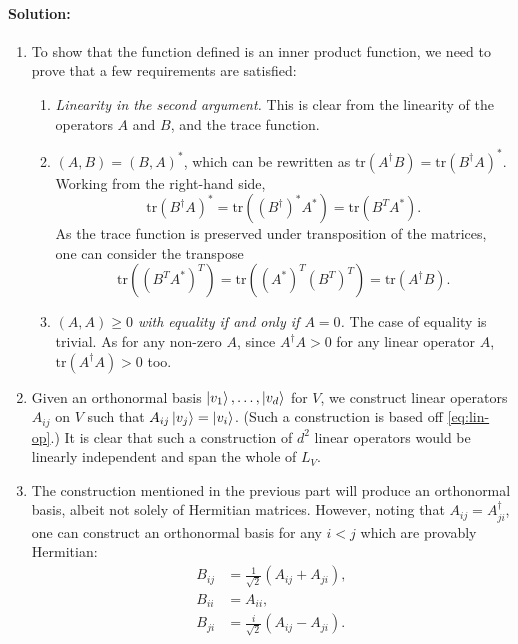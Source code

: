 \paragraph{Solution:} \begin{enumerate}
  \item To show that the function defined is an inner product function, we need
    to prove that a few requirements are satisfied: \begin{enumerate}
      \item \emph{Linearity in the second argument.} This is clear from the
        linearity of the operators $A$ and $B$, and the trace function.
      \item \emph{$(A, B) = (B, A)^*$}, which can be rewritten as $\mathrm{tr}
        (A^\dagger B) = \mathrm{tr}(B^\dagger A)^*$. Working from the
        right-hand side, \begin{equation*}
          \mathrm{tr}(B^\dagger A)^* = \mathrm{tr}((B^\dagger)^* A^*) =
            \mathrm{tr}(B^T A^*).
        \end{equation*}
        As the trace function is preserved under transposition of the matrices,
        one can consider the transpose \begin{equation*}
          \mathrm{tr}((B^T A^*)^T) = \mathrm{tr}((A^*)^T (B^T)^T) = \mathrm{tr}
            (A^\dagger B).
        \end{equation*}
      \item \emph{$(A, A) \geq 0$ with equality if and only if $A = 0$.} The
        case of equality is trivial. As for any non-zero $A$, since $A^\dagger
        A > 0$ for any linear operator $A$, $\mathrm{tr}(A^\dagger A) > 0$ too.
    \end{enumerate}
  \item Given an orthonormal basis $\ket{v_1}, \ldots, \ket{v_d}$ for $V$, we
    construct linear operators $A_{ij}$ on $V$ such that $A_{ij}\ket{v_j} =
    \ket{v_i}$. (Such a construction is based off \eqref{eq:lin-op}.) It is
    clear that such a construction of $d^2$ linear operators would be linearly
    independent and span the whole of $L_V$.
  \item The construction mentioned in the previous part will produce an
    orthonormal basis, albeit not solely of Hermitian matrices. However, noting
    that $A_{ij} = A_{ji}^\dagger$, one can construct an orthonormal basis for
    any $i < j$ which are provably Hermitian:
    \begin{align*}
      B_{ij} &= \frac{1}{\sqrt{2}}(A_{ij} + A_{ji}), \\
      B_{ii} &= A_{ii}, \\
      B_{ji} &= \frac{i}{\sqrt{2}}(A_{ij} - A_{ji}). \\
    \end{align*}
\end{enumerate}

